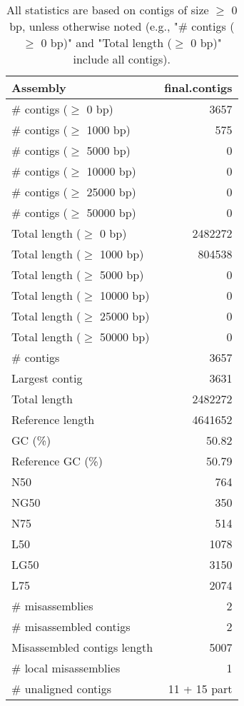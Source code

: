 \documentclass[12pt,a4paper]{article}
\begin{document}
\begin{table}[ht]
\begin{center}
\caption{All statistics are based on contigs of size $\geq$ 0 bp, unless otherwise noted (e.g., "\# contigs ($\geq$ 0 bp)" and "Total length ($\geq$ 0 bp)" include all contigs).}
\begin{tabular}{|l*{1}{|r}|}
\hline
Assembly & final.contigs \\ \hline
\# contigs ($\geq$ 0 bp) & 3657 \\ \hline
\# contigs ($\geq$ 1000 bp) & 575 \\ \hline
\# contigs ($\geq$ 5000 bp) & 0 \\ \hline
\# contigs ($\geq$ 10000 bp) & 0 \\ \hline
\# contigs ($\geq$ 25000 bp) & 0 \\ \hline
\# contigs ($\geq$ 50000 bp) & 0 \\ \hline
Total length ($\geq$ 0 bp) & 2482272 \\ \hline
Total length ($\geq$ 1000 bp) & 804538 \\ \hline
Total length ($\geq$ 5000 bp) & 0 \\ \hline
Total length ($\geq$ 10000 bp) & 0 \\ \hline
Total length ($\geq$ 25000 bp) & 0 \\ \hline
Total length ($\geq$ 50000 bp) & 0 \\ \hline
\# contigs & 3657 \\ \hline
Largest contig & 3631 \\ \hline
Total length & 2482272 \\ \hline
Reference length & 4641652 \\ \hline
GC (\%) & 50.82 \\ \hline
Reference GC (\%) & 50.79 \\ \hline
N50 & 764 \\ \hline
NG50 & 350 \\ \hline
N75 & 514 \\ \hline
L50 & 1078 \\ \hline
LG50 & 3150 \\ \hline
L75 & 2074 \\ \hline
\# misassemblies & 2 \\ \hline
\# misassembled contigs & 2 \\ \hline
Misassembled contigs length & 5007 \\ \hline
\# local misassemblies & 1 \\ \hline
\# unaligned contigs & 11 + 15 part \\ \hline

\end{tabular}
\end{center}
\end{table}
\end{document}
